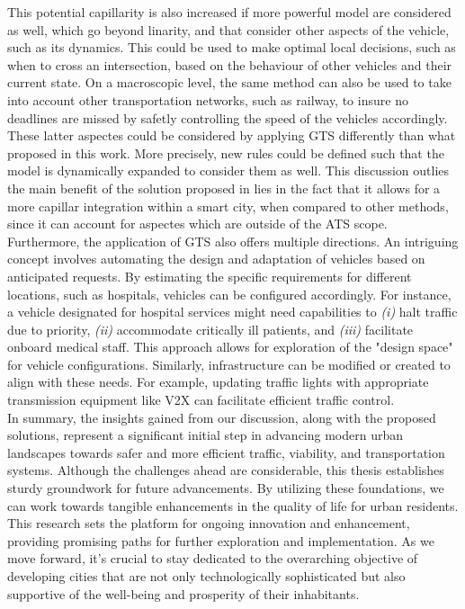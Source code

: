 This potential capillarity is also increased if more powerful model are considered as well, which go beyond linarity, and that consider other aspects of the vehicle, such as its dynamics. This could be used to make optimal local decisions, such as when to cross an intersection, based on the behaviour of other vehicles and their current state. On a macroscopic level, the same method can also be used to take into account other transportation networks, such as railway, to insure no deadlines are missed by safetly controlling the speed of the vehicles accordingly. These latter aspectes could be considered by applying GTS differently than what proposed in this work. More precisely, new rules could be defined such that the model is dynamically expanded to consider them as well. This discussion outlies the main benefit of the solution proposed in  lies in the fact that it allows for a more capillar integration within a smart city, when compared to other methods, since it can account for aspectes which are outside of the ATS scope.\\
 Furthermore, the application of GTS also offers multiple directions. An intriguing concept involves automating the design and adaptation of vehicles based on anticipated requests. By estimating the specific requirements for different locations, such as hospitals, vehicles can be configured accordingly. For instance, a vehicle designated for hospital services might need capabilities to \textit{(i)} halt traffic due to priority, \textit{(ii)} accommodate critically ill patients, and \textit{(iii)} facilitate onboard medical staff. This approach allows for exploration of the "design space" for vehicle configurations. Similarly, infrastructure can be modified or created to align with these needs. For example, updating traffic lights with appropriate transmission equipment like V2X can facilitate efficient traffic control. \\
In summary, the insights gained from our discussion, along with the proposed solutions, represent a significant initial step in advancing modern urban landscapes towards safer and more efficient traffic, viability, and transportation systems. Although the challenges ahead are considerable, this thesis establishes sturdy groundwork for future advancements. By utilizing these foundations, we can work towards tangible enhancements in the quality of life for urban residents. This research sets the platform for ongoing innovation and enhancement, providing promising paths for further exploration and implementation. As we move forward, it's crucial to stay dedicated to the overarching objective of developing cities that are not only technologically sophisticated but also supportive of the well-being and prosperity of their inhabitants.